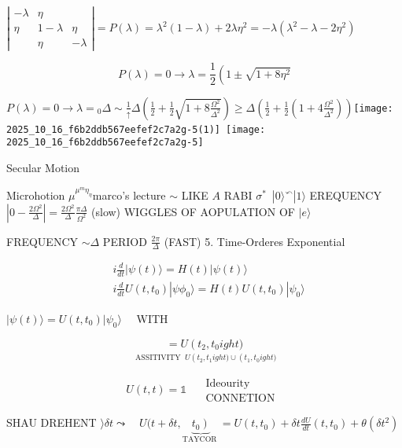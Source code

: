 $\left|\begin{array}{ccc}-\lambda & \eta & \\ \eta & 1-\lambda & \eta \\ & \eta & -\lambda\end{array}\right|=P(\lambda)=\lambda^{2}(1-\lambda)+2 \lambda \eta^{2}=-\lambda\left(\lambda^{2}-\lambda-2 \eta^{2}\right)$

$$
P(\lambda)=0 \rightarrow \lambda=\frac{1}{2}\left(1 \pm \sqrt{1+8 \eta^{2}}
$$

$P(\lambda)=0 \rightarrow \lambda={ }_{0}$\n$\Delta \sim \frac{1}{\uparrow} \Delta\left(\frac{1}{2}+\frac{1}{2} \sqrt{1+8 \frac{\Omega^{2}}{\Delta^{2}}}\right) \geqslant \Delta\left(\frac{1}{2}+\frac{1}{2}\left(1+4 \frac{\Omega^{2}}{\Delta^{2}}\right)\right)$\n\texttt{[image: 2025\_10\_16\_f6b2ddb567eefef2c7a2g-5(1)]}\
\texttt{[image: 2025\_10\_16\_f6b2ddb567eefef2c7a2g-5]}

Secular Motion

Microhotion $\mu^{\mu^{m} \eta_{\eta}}$\nsee marco's lecture
$\sim$ LIKE $A$ RABI $\sigma^{*}$\
$|0\rangle{ }^{\curvearrowleft}|1\rangle$
EREQUENCY $\left|0-\frac{2 \Omega^{2}}{\Delta}\right|=\frac{2 \Omega^{2}}{\Delta}$\nDERIOD $\frac{\pi \Delta}{\Omega^{2}}$ (slow)
WIGGLES OF AOPULATION OF $|e\rangle$

FREQUENCY $\sim \Delta$
PERIOD $\frac{2 \pi}{\Delta}$ (FAST)
5. Time-Orderes Exponential

$$
\begin{aligned}
&i \frac{d}{d t}|\psi(t)\rangle =H(t)|\psi(t)\rangle \\
&i \frac{d}{d t} U\left(t, t_{0}\right)|\psi \phi_{0}\rangle =H(t) U\left(t, t_{0}\right)|\psi_{0}\rangle
\end{aligned}
$$

$|\psi(t)\rangle=U\left(t, t_{0}\right)|\psi_{0}\rangle \quad$ WITH

$$
\underset{\substack{\text { ASSITIVITY } \ U\left(t_{2}, t_{1}
ight) \cup\left(t_{1}, t_{0}
ight)}}{=U\left(t_{2}, t_{0}
ight)}
$$

$$
U(t, t)=\mathbb{1} \quad \begin{gathered}\text { Ideourity } \\ \text { CONNETION }\end{gathered}
$$

SHAU DREHENT $\rangle \delta t \leadsto \quad U(t+\delta t, \underbrace{\left.t_{0}\right)}_{\text {TAYCOR }}=U\left(t, t_{0}\right)+\delta t \frac{d U}{d t}\left(t, t_{0}\right)+\theta\left(\delta t^{2}\right)$

